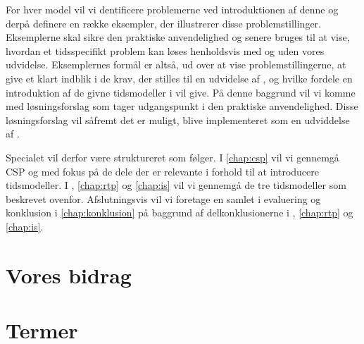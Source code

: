 For hver model vil vi dentificere problemerne ved introduktionen af denne og derpå definere en række eksempler, der illustrerer disse problemstillinger. Eksemplerne skal sikre den praktiske anvendelighed og senere bruges til at vise, hvordan et tidsspecifikt problem kan løses henholdsvis med og uden vores udvidelse. Eksemplernes formål er altså, ud over at vise problemstillingerne, at give et klart indblik i de krav, der stilles til en udvidelse af \pycsp, og hvilke fordele en introduktion af de givne tidsmodeller i \pycsp vil give. På denne baggrund vil vi komme med løsningsforslag som tager udgangspunkt i den praktiske anvendelighed. Disse løsningsforslag vil såfremt det er muligt, blive implementeret som en udviddelse af \pycsp.

Specialet vil derfor være struktureret som følger. I \autoref{chap:csp} vil vi gennemgå CSP og \pycsp med fokus på de dele der er relevante i forhold til at introducere tidsmodeller. I , \ref{chap:rtp} og \ref{chap:is} vil vi gennemgå de tre tidsmodeller som beskrevet ovenfor. Afslutningsvis vil vi foretage en samlet i evaluering og konklusion i \autoref{chap:konklusion} på baggrund af delkonklusionerne i , \ref{chap:rtp} og \ref{chap:is}.



\section{Vores bidrag}
\section{Termer}

